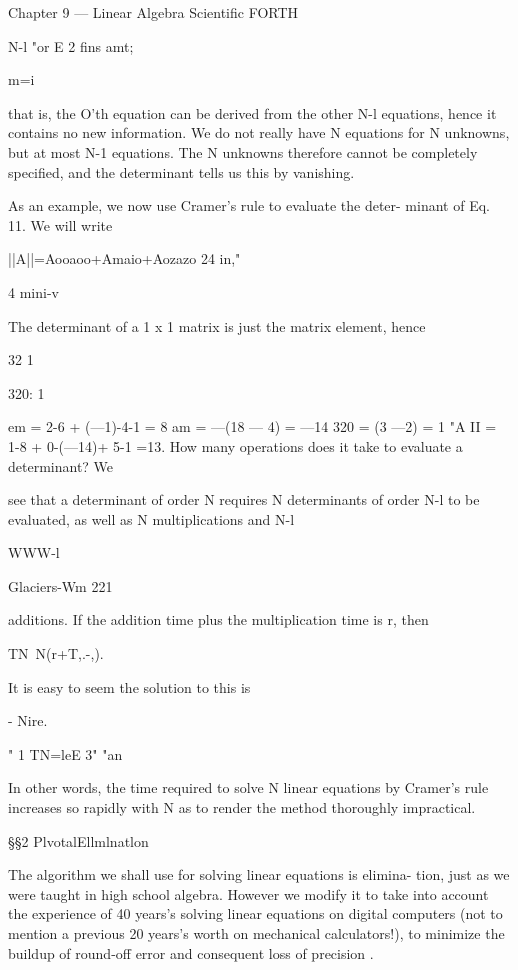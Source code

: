 {Chapter 9 — Linear Algebra Scientific FORTH

N-l
"or E 2 fins amt;

m=i

that is, the O'th equation can be derived from the other N-l
equations, hence it contains no new information. We do not really
have N equations for N unknowns, but at most N-1 equations. The
N unknowns therefore cannot be completely specified, and the
determinant tells us this by vanishing.

As an example, we now use Cramer's rule to evaluate the deter-
minant of Eq. 11. We will write

||A||=Aooaoo+Amaio+Aozazo
24
in,"

4
mini-v

The determinant of a 1 x 1 matrix is just the matrix element, hence

32
1

320: 1

 

 

 

em = 2-6 + (—1)-4-1 = 8
am = —(18 — 4) = —14
320 = (3 —2) = 1
"A II = 1-8 + 0-(—14)+ 5-1 =13.
How many operations does it take to evaluate a determinant? We

see that a determinant of order N requires N determinants of
order N-l to be evaluated, as well as N multiplications and N-l

WWW-l

Glaciers-Wm 221

additions. If the addition time plus the multiplication time is r,
then

TN~N(r+T,.-,).

It is easy to seem the solution to this is

- Nire.

" 1
TN=leE 3" "an

In other words, the time required to solve N linear equations by
Cramer's rule increases so rapidly with N as to render the method
thoroughly impractical.

\S\S2 PlvotalEllmlnatlon

The algorithm we shall use for solving linear equations is elimina-
tion, just as we were taught in high school algebra. However we
modify it to take into account the experience of 40 years's solving
linear equations on digital computers (not to mention a previous
20 years's worth on mechanical calculators!), to minimize the
buildup of round-off error and consequent loss of precision .

}
